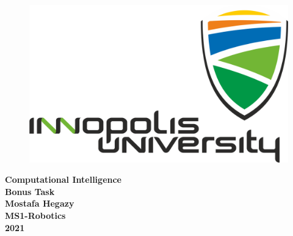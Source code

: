 \documentclass[a4paper]{article}
\begin{document}
\begin{titlepage}

\begin{figure}[h!]
\centering
\includegraphics[width=1\textwidth]{InnoLogo.png}
\label{fig:entropy} 
\end{figure}

\vspace{1.5in}

\centering
\Huge{\textbf{Computational Intelligence\\ Bonus Task}}\\[2.0in]

\LARGE{\textbf{Mostafa Hegazy}}\\[0.2in]

\normalsize{\textbf{MS1-Robotics}}\\[0.2in]

\large{\textbf{2021}}
\end{titlepage}
\newpage
\end{document}
